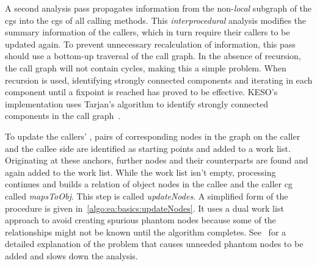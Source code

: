 			A second analysis pass propagates information from the non-\emph{local} subgraph of the \glspl{cg} into the
			\glspl{cg} of all calling methods. This \emph{interprocedural} analysis modifies the summary information of the
			callers, which in turn require their callers to be updated again. To prevent unnecessary recalculation of
			information, this pass should use a bottom-up traversal of the call graph. In the absence of recursion, the call
			graph will not contain cycles, making this a simple problem. When recursion is used, identifying strongly
			connected components and iterating in each component until a fixpoint is reached has proved to be effective.
			KESO's implementation uses Tarjan's algorithm to identify strongly connected components in the call
			graph~\cite{tarjan:72:lga}.

			To update the callers' , pairs of corresponding nodes in the graph on the caller and the callee side
			are identified as starting points and added to a work list. Originating at these anchors, further nodes and their
			counterparts are found and again added to the work list. While the work list isn't empty, processing continues and
			builds a relation of object nodes in the callee and the caller \gls{cg} called \emph{mapsToObj}. This step is
			called \emph{updateNodes}. A simplified form of the procedure is given in~\cref{algo:ea:basics:updateNodes}. It
			uses a dual work list approach to avoid creating spurious phantom nodes because some of the relationships might
			not be known until the algorithm completes. See~\cite[Sec. 3.2.1]{lang:12} for a detailed explanation of the
			problem that causes unneeded phantom nodes to be added and slows down the analysis.

